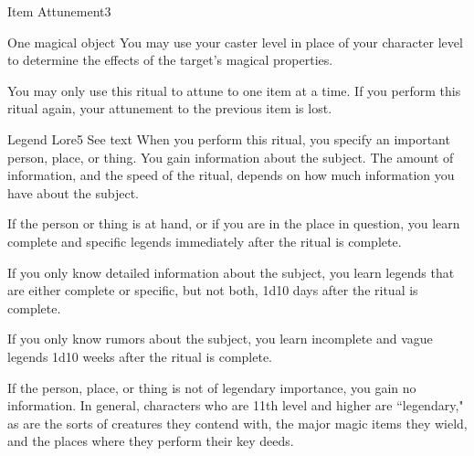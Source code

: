 \begin{spellsection}{Item Attunement}{3}
\begin{spelltarget}{One magical object}
    \spelleffect You may use your caster level in place of your character level to determine the effects of the target's magical properties.
\end{spelltarget}
\spellnotes You may only use this ritual to attune to one item at a time. If you perform this ritual again, your attunement to the previous item is lost.
\end{spellsection}

\begin{spellsection}{Legend Lore}{5}
\spelldur See text
\spelleffect When you perform this ritual, you specify an important person, place, or thing. You gain information about the subject. The amount of information, and the speed of the ritual, depends on how much information you have about the subject.

If the person or thing is at hand, or if you are in the place in question, you learn complete and specific legends immediately after the ritual is complete.

If you only know detailed information about the subject, you learn legends that are either complete or specific, but not both, 1d10 days after the ritual is complete.

If you only know rumors about the subject, you learn incomplete and vague legends 1d10 weeks after the ritual is complete.

\spellnotes If the person, place, or thing is not of legendary importance, you gain no information. In general, characters who are 11th level and higher are ``legendary," as are the sorts of creatures they contend with, the major magic items they wield, and the places where they perform their key deeds.
\end{spellsection}

